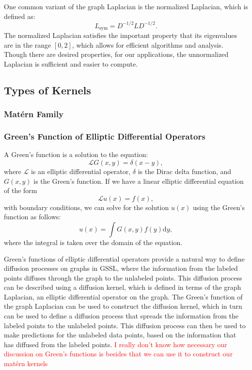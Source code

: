 \documentclass[12pt]{amsart}
\begin{document}
One common variant of the graph Laplacian is the normalized Laplacian, which is defined as:
$$ L_{\text{sym}} = D^{-1/2} L D^{-1/2}. $$
The normalized Laplacian satisfies the important property that its eigenvalues are in the range $[0, 2]$, which allows for efficient algorithms and analysis. Though there are desired properties, for our applications, the unnormalized Laplacian is sufficient and easier to compute.

\subsection{Types of Kernels}
\subsubsection{Mat\'{e}rn Family}
\subsubsection{Green's Function of Elliptic Differential Operators}
A Green's function is a solution to the equation:
$$\mathcal{L} G(x,y) = \delta(x-y),$$
where $\mathcal{L}$ is an elliptic differential operator, $\delta$ is the Dirac delta function, and $G(x,y)$ is the Green's function. If we have a linear elliptic differential equation of the form
$$\mathcal{L} u(x) = f(x),$$
with boundary conditions, we can solve for the solution $u(x)$ using the Green's function as follows:
$$u(x) = \int G(x,y) f(y) \mathrm{d}y,$$
where the integral is taken over the domain of the equation.

Green's functions of elliptic differential operators provide a natural way to define diffusion processes on graphs in GSSL, where the information from the labeled points diffuses through the graph to the unlabeled points. This diffusion process can be described using a diffusion kernel, which is defined in terms of the graph Laplacian, an elliptic differential operator on the graph. The Green's function of the graph Laplacian can be used to construct the diffusion kernel, which in turn can be used to define a diffusion process that spreads the information from the labeled points to the unlabeled points. This diffusion process can then be used to make predictions for the unlabeled data points, based on the information that has diffused from the labeled points.
\textcolor{red}{I really don't know how necessary our discussion on Green's functions is besides that we can use it to construct our matérn kernels}
\end{document}
